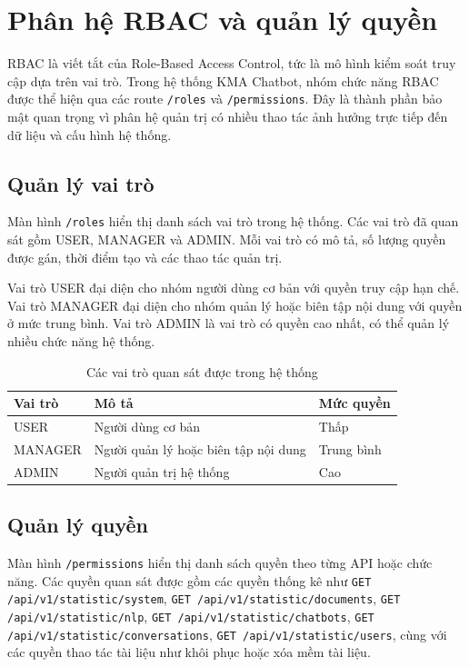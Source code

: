\section{Phân hệ RBAC và quản lý quyền}

RBAC là viết tắt của Role-Based Access Control, tức là mô hình kiểm soát truy cập dựa trên vai trò. Trong hệ thống KMA Chatbot, nhóm chức năng RBAC được thể hiện qua các route \texttt{/roles} và \texttt{/permissions}. Đây là thành phần bảo mật quan trọng vì phân hệ quản trị có nhiều thao tác ảnh hưởng trực tiếp đến dữ liệu và cấu hình hệ thống.

\subsection{Quản lý vai trò}

Màn hình \texttt{/roles} hiển thị danh sách vai trò trong hệ thống. Các vai trò đã quan sát gồm USER, MANAGER và ADMIN. Mỗi vai trò có mô tả, số lượng quyền được gán, thời điểm tạo và các thao tác quản trị.

Vai trò USER đại diện cho nhóm người dùng cơ bản với quyền truy cập hạn chế. Vai trò MANAGER đại diện cho nhóm quản lý hoặc biên tập nội dung với quyền ở mức trung bình. Vai trò ADMIN là vai trò có quyền cao nhất, có thể quản lý nhiều chức năng hệ thống.

\begin{table}[H]
\centering
\caption{Các vai trò quan sát được trong hệ thống}
\label{tab:roles-observed}
\begin{tabular}{|p{3cm}|p{6cm}|p{4cm}|}
\hline
\textbf{Vai trò} & \textbf{Mô tả} & \textbf{Mức quyền} \\ \hline
USER & Người dùng cơ bản & Thấp \\ \hline
MANAGER & Người quản lý hoặc biên tập nội dung & Trung bình \\ \hline
ADMIN & Người quản trị hệ thống & Cao \\ \hline
\end{tabular}
\end{table}

\subsection{Quản lý quyền}

Màn hình \texttt{/permissions} hiển thị danh sách quyền theo từng API hoặc chức năng. Các quyền quan sát được gồm các quyền thống kê như \texttt{GET /api/v1/statistic/system}, \texttt{GET /api/v1/statistic/documents}, \texttt{GET /api/v1/statistic/nlp}, \texttt{GET /api/v1/statistic/chatbots}, \texttt{GET /api/v1/statistic/conversations}, \texttt{GET /api/v1/statistic/users}, cùng với các quyền thao tác tài liệu như khôi phục hoặc xóa mềm tài liệu.

